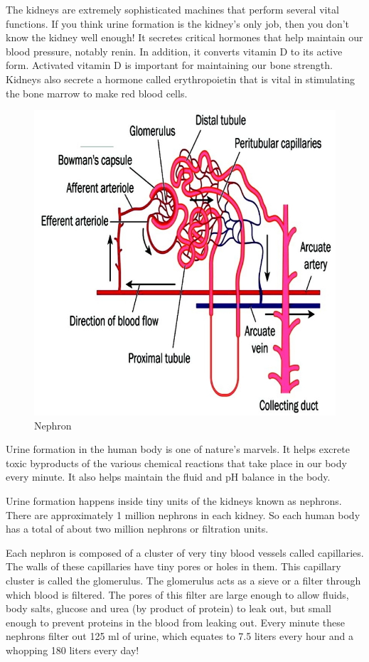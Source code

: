 The kidneys are extremely sophisticated machines that perform several vital functions. If you think urine formation is the kidney’s only job, then you don’t know the kidney well enough! It secretes critical hormones that help maintain our blood pressure, notably renin. In addition, it converts vitamin D to its active form. Activated vitamin D is important for maintaining our bone strength. Kidneys also secrete a hormone called erythropoietin that is vital in stimulating the bone marrow to make red blood cells.

\begin{figure}
\caption{Nephron}
\includegraphics{images/046.jpg}
\end{figure}

Urine formation in the human body is one of nature’s marvels. It helps excrete toxic byproducts of the various chemical reactions that take place in our body every minute. It also helps maintain the fluid and pH balance in the body.

Urine formation happens inside tiny units of the kidneys known as nephrons. There are approximately 1 million nephrons in each kidney. So each human body has a total of about two million nephrons or filtration units.

Each nephron is composed of a cluster of very tiny blood vessels called capillaries. The walls of these capillaries have tiny pores or holes in them. This capillary cluster is called the glomerulus. The glomerulus acts as a sieve or a filter through which blood is filtered. The pores of this filter are large enough to allow fluids, body salts, glucose and urea (by product of protein) to leak out, but small enough to prevent proteins in the blood from leaking out. Every minute these nephrons filter out 125 ml of urine, which equates to 7.5 liters every hour and a whopping 180 liters every day!


